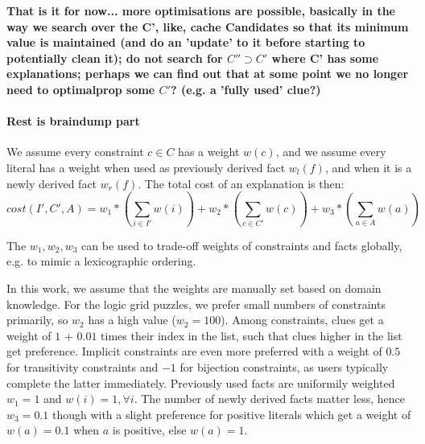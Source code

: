 \begin{algorithmic}
    \EndIf
  \EndFor
\EndFunction
\end{algorithmic}

\textbf{That is it for now... more optimisations are possible, basically in the way we search over the C', like, cache Candidates so that its minimum value is maintained (and do an 'update' to it before starting to potentially clean it); do not search for $C'' \supset C'$ where C' has some explanations; perhaps we can find out that at some point we no longer need to optimalprop some $C'$? (e.g. a 'fully used' clue?)}

\paragraph{Rest is braindump part}
We assume every constraint $c \in C$ has a weight $w(c)$, and we assume every literal has a weight when used as previously derived fact $w_l(f)$, and when it is a newly derived fact $w_r(f)$. The total cost of an explanation is then:
$$ cost(I', C', A) = w_1*(\sum_{i \in I'} w(i)) + w_2*(\sum_{c \in C'} w(c)) + w_3*(\sum_{a \in A} w(a))$$

The $w_1, w_2, w_3$ can be used to trade-off weights of constraints and facts globally, e.g. to mimic a lexicographic ordering.

In this work, we assume that the weights are manually set based on domain knowledge. For the logic grid puzzles, we prefer small numbers of constraints primarily, so $w_2$ has a high value ($w_2=100$). Among constraints, clues get a weight of $1$ + $0.01$ times their index in the list, such that clues higher in the list get preference. Implicit constraints are even more preferred with a weight of $0.5$ for transitivity constraints and $-1$ for bijection constraints, as users typically complete the latter immediately.
Previously used facts are uniformily weighted $w_1=1$ and $w(i)=1, \forall i$. The number of newly derived facts matter less, hence $w_3=0.1$ though with a slight preference for positive literals which get a weight of $w(a)=0.1$ when $a$ is positive, else $w(a)=1$.

